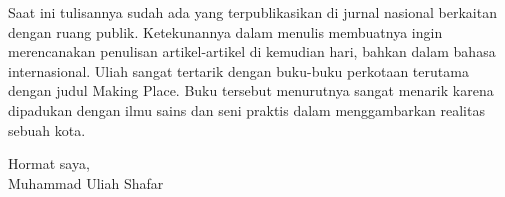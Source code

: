 \documentclass[12pt,oneside]{udthesis}\usepackage[]{graphicx}\usepackage[]{color}
\begin{document}
Saat ini tulisannya sudah ada yang terpublikasikan di jurnal nasional berkaitan dengan ruang publik. Ketekunannya dalam menulis membuatnya ingin merencanakan penulisan artikel-artikel di kemudian hari, bahkan dalam bahasa internasional. Uliah sangat tertarik dengan buku-buku perkotaan terutama dengan judul Making Place. Buku tersebut menurutnya sangat menarik karena dipadukan dengan ilmu sains dan seni praktis dalam menggambarkan realitas sebuah kota.

\vspace{2\baselineskip}
\begin{flushright}
    Hormat saya,\\ Muhammad Uliah Shafar
\end{flushright}



\end{document}
